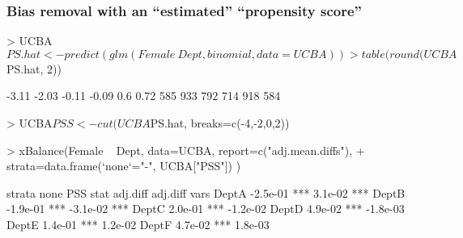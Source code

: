 \begin{frame}[fragile]
  \frametitle{Bias removal with an ``estimated'' ``propensity score''}
\begin{Schunk}
\begin{Sinput}
> UCBA$PS.hat <- predict( glm(Female~Dept, binomial, data=UCBA) )
> table(round(UCBA$PS.hat, 2))
\end{Sinput}
\begin{Soutput}
-3.11 -2.03 -0.11 -0.09   0.6  0.72 
  585   933   792   714   918   584 
\end{Soutput}
\begin{Sinput}
> UCBA$PSS <- cut(UCBA$PS.hat, breaks=c(-4,-2,0,2))
\end{Sinput}
\end{Schunk}

\begin{Schunk}
\begin{Sinput}
> xBalance(Female ~ Dept, data=UCBA, report=c("adj.mean.diffs"), 
+          strata=data.frame(`none`="-", UCBA["PSS"])     )
\end{Sinput}
\begin{Soutput}
      strata     none               PSS         
      stat   adj.diff          adj.diff         
vars                                            
DeptA        -2.5e-01 ***      3.1e-02  ***     
DeptB        -1.9e-01 ***      -3.1e-02 ***     
DeptC        2.0e-01  ***      -1.2e-02         
DeptD        4.9e-02  ***      -1.8e-03         
DeptE        1.4e-01  ***      1.2e-02          
DeptF        4.7e-02  ***      1.8e-03          
\end{Soutput}
\end{Schunk}

\end{frame}

